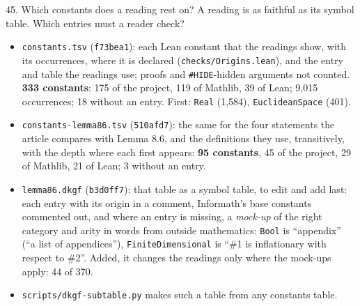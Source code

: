 \documentclass[10pt,aspectratio=169]{beamer}
\newcommand{\commit}[1]{\texttt{\footnotesize #1}}
\begin{document}
\begin{frame}{45. Which constants does a reading rest on?}
  \scriptsize
  A reading is as faithful as its symbol table. Which entries must a reader check?
  \begin{itemize}
    \item \texttt{constants.tsv} (\commit{f73bea1}): each Lean constant that the readings show,
          with its occurrences, where it is declared (\texttt{checks/Origins.lean}), and the entry
          and table the readings use; proofs and \texttt{\#HIDE}-hidden arguments not counted.
          \textbf{333 constants}: 175 of the project, 119 of Mathlib, 39 of Lean; 9,015
          occurrences; 18 without an entry. First: \texttt{Real} (1,584),
          \texttt{EuclideanSpace} (401).
    \item \texttt{constants-lemma86.tsv} (\commit{510afd7}): the same for the four statements
          the article compares with Lemma 8.6, and the definitions they use, transitively, with
          the depth where each first appears: \textbf{95 constants}, 45 of the project, 29 of
          Mathlib, 21 of Lean; 3 without an entry.
    \item \texttt{lemma86.dkgf} (\commit{b3d0ff7}): that table as a symbol table, to edit and add
          last: each entry with its origin in a comment, Informath's base constants commented
          out, and where an entry is missing, a \emph{mock-up} of the right category and arity
          in words from outside mathematics: \texttt{Bool} is ``appendix'' (``a list of
          appendices''), \texttt{FiniteDimensional} is ``\#1 is inflationary with respect to
          \#2''. Added, it changes the readings only where the mock-ups apply: 44 of 370.
    \item \texttt{scripts/dkgf-subtable.py} makes such a table from any constants table.
  \end{itemize}
\end{frame}
\end{document}
